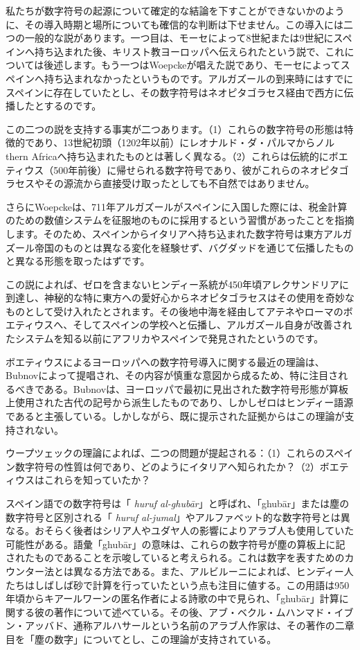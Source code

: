 \documentclass[a4paper,11pt,openany]{ltjsbook}
\begin{document}
私たちが数字符号の起源について確定的な結論を下すことができないかのように、その導入時期と場所についても確信的な判断は下せません。この導入には二つの一般的な説があります。一つ目は、モーセによって8世紀または9世紀にスペインへ持ち込まれた後、キリスト教ヨーロッパへ伝えられたという説で、これについては後述します。もう一つはWoepckeが唱えた説であり、モーセによってスペインへ持ち込まれなかったというものです。アルガズールの到来時にはすでにスペインに存在していたとし、その数字符号はネオピタゴラセス経由で西方に伝播したとするのです。

この二つの説を支持する事実が二つあります。（1）これらの数字符号の形態は特徴的であり、13世紀初頭（1202年以前）にレオナルド・ダ・パルマからノルthern Africaへ持ち込まれたものとは著しく異なる。（2）これらは伝統的にボエティウス（500年前後）に帰せられる数字符号であり、彼がこれらのネオピタゴラセスやその源流から直接受け取ったとしても不自然ではありません。

さらにWoepckeは、711年アルガズールがスペインに入国した際には、税金計算のための数値システムを征服地のものに採用するという習慣があったことを指摘します。そのため、スペインからイタリアへ持ち込まれた数字符号は東方アルガズール帝国のものとは異なる変化を経験せず、バグダッドを通じて伝播したものと異なる形態を取ったはずです。

この説によれば、ゼロを含まないヒンディー系統が450年頃アレクサンドリアに到達し、神秘的な特に東方への愛好心からネオピタゴラセスはその使用を奇妙なものとして受け入れたとされます。その後地中海を経由してアテネやローマのボエティウスへ、そしてスペインの学校へと伝播し、アルガズール自身が改善されたシステムを知る以前にアフリカやスペインで発見されたというのです。

ボエティウスによるヨーロッパへの数字符号導入に関する最近の理論は、Bubnovによって提唱され、その内容が慎重な意図から成るため、特に注目されるべきである。Bubnovは、ヨーロッパで最初に見出された数字符号形態が算板上使用された古代の記号から派生したものであり、しかしゼロはヒンディー語源であると主張している。しかしながら、既に提示された証拠からはこの理論が支持されない。

ウープツェックの理論によれば、二つの問題が提起される：（1）これらのスペイン数字符号の性質は何であり、どのようにイタリアへ知られたか？（2）ボエティウスはこれらを知っていたか？

スペイン語での数字符号は「\textit{ huruf al-ghubār}」と呼ばれ、「ghubār」または塵の数字符号と区別される「\textit{ huruf al-jumal}」やアルファベット的な数字符号とは異なる。おそらく後者はシリア人やユダヤ人の影響によりアラブ人も使用していた可能性がある。語彙「ghubār」の意味は、これらの数字符号が塵の算板上に記されたものであることを示唆していると考えられる。これは数字を表すためのカウンター法とは異なる方法である。また、アルビルーニによれば、ヒンディー人たちはしばしば砂で計算を行っていたという点も注目に値する。この用語は950年頃からキアールワーンの匿名作者による詩歌の中で見られ、「ghubār」計算に関する彼の著作について述べている。その後、アブ・ベクル・ムハンマド・イブン・アッバド、通称アルハサールという名前のアラブ人作家は、その著作の二章目を「塵の数字」についてとし、この理論が支持されている。
\end{document}
